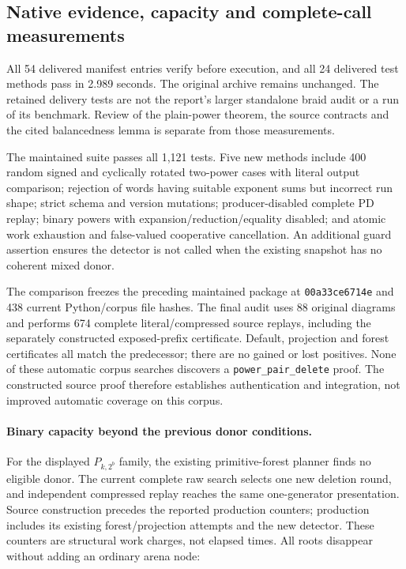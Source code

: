 \subsection{Native evidence, capacity and complete-call measurements}

All 54 delivered manifest entries verify before execution, and all 24 delivered
test methods pass in 2.989 seconds. The original archive remains unchanged.
The retained delivery tests are not the report's larger standalone braid audit
or a run of its benchmark. Review of the plain-power theorem, the source
contracts and the cited balancedness lemma is separate from those measurements.

The maintained suite passes all 1,121 tests. Five new methods include 400
random signed and cyclically rotated two-power cases with literal output
comparison; rejection of words having suitable exponent sums but incorrect
run shape; strict schema and version mutations; producer-disabled complete
PD replay; binary powers with expansion/reduction/equality disabled; and
atomic work exhaustion and false-valued cooperative cancellation. An additional
guard assertion ensures the detector is not called when the existing snapshot
has no coherent mixed donor.

The comparison freezes the preceding maintained package at
\texttt{00a33ce6714e} and 438 current Python/corpus file hashes. The final audit
uses 88 original diagrams and performs 674 complete literal/compressed source
replays, including the separately constructed exposed-prefix certificate.
Default, projection and forest certificates all match the predecessor; there
are no gained or lost positives. None of these automatic corpus searches
discovers a \texttt{power\_pair\_delete} proof. The constructed source proof
therefore establishes authentication and integration, not improved automatic
coverage on this corpus.

\paragraph{Binary capacity beyond the previous donor conditions.}
For the displayed $P_{k,2^b}$ family, the existing primitive-forest planner
finds no eligible donor. The current complete raw search selects one new
deletion round, and independent compressed replay reaches the same one-generator
presentation. Source construction precedes the reported production counters;
production includes its existing forest/projection attempts and the new
detector. These counters are structural work charges, not elapsed times.
All roots disappear without adding an ordinary arena node:


